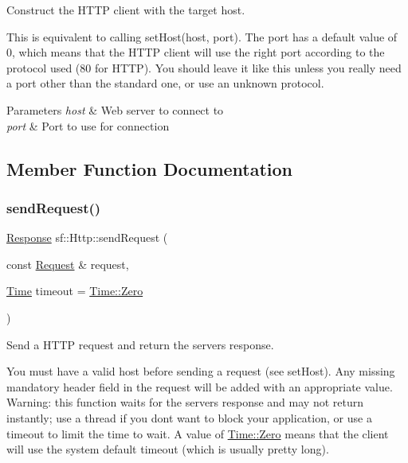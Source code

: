 Construct the H\+T\+TP client with the target host. 

This is equivalent to calling set\+Host(host, port). The port has a default value of 0, which means that the H\+T\+TP client will use the right port according to the protocol used (80 for H\+T\+TP). You should leave it like this unless you really need a port other than the standard one, or use an unknown protocol.


\begin{DoxyParams}{Parameters}
{\em host} & Web server to connect to \\
\hline
{\em port} & Port to use for connection \\
\hline
\end{DoxyParams}


\subsection{Member Function Documentation}
\mbox{\label{classsf_1_1_http_aaf09ebfb5e00dcc82e0d494d5c6a9e2a}} 
\subsubsection{\texorpdfstring{send\+Request()}{sendRequest()}}
{\footnotesize\ttfamily \hyperlink{classsf_1_1_http_1_1_response}{Response} sf\+::\+Http\+::send\+Request (\begin{DoxyParamCaption}\item[{const \hyperlink{classsf_1_1_http_1_1_request}{Request} \&}]{request,  }\item[{\hyperlink{classsf_1_1_time}{Time}}]{timeout = {\ttfamily \hyperlink{classsf_1_1_time_a8db127b632fa8da21550e7282af11fa0}{Time\+::\+Zero}} }\end{DoxyParamCaption})}



Send a H\+T\+TP request and return the server\textquotesingle{}s response. 

You must have a valid host before sending a request (see set\+Host). Any missing mandatory header field in the request will be added with an appropriate value. Warning\+: this function waits for the server\textquotesingle{}s response and may not return instantly; use a thread if you don\textquotesingle{}t want to block your application, or use a timeout to limit the time to wait. A value of \hyperlink{classsf_1_1_time_a8db127b632fa8da21550e7282af11fa0}{Time\+::\+Zero} means that the client will use the system default timeout (which is usually pretty long).


